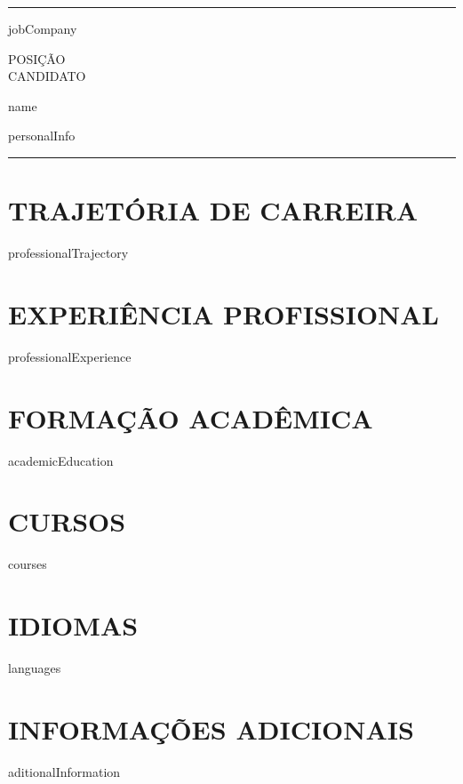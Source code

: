 \documentclass[10.5pt, a4paper]{report}
\begin{document}
\rule{\textwidth}{0.1pt}\vspace{-10pt}

{{jobCompany}}

\begin{minipage}[t]{0.3\textwidth}
  POSIÇÃO \\
  CANDIDATO
\end{minipage}%
{{ name }}

\vspace{5pt}

{{ personalInfo }}

\vspace{-5pt}
\rule{\textwidth}{0.1pt}\vspace{-10pt}

\section{TRAJETÓRIA DE CARREIRA}

{{ professionalTrajectory }}


\section{EXPERIÊNCIA PROFISSIONAL}

{{professionalExperience}}

\section{FORMAÇÃO ACADÊMICA}

{{academicEducation}}

\section{CURSOS}
{{ courses }}

\section{IDIOMAS}
{{ languages }}


\section{INFORMAÇÕES ADICIONAIS}
{{ aditionalInformation }}
\end{document}
